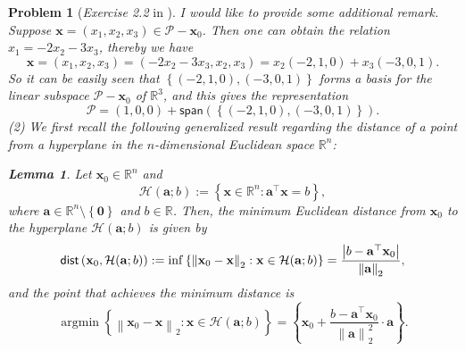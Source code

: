 \documentclass[11pt]{article}
\newtheorem{lemma}{Lemma}
\newtheorem{problem}{Problem}
\DeclareMathOperator*{\argmin}{argmin}
\begin{document}
\begin{problem} [\emph{Exercise 2.2} in \cite{calafiore2014optimization}]
{\indent I would like to provide some additional remark. Suppose $\mathbf{x} = \left( x_1, x_2, x_3 \right) \in \mathcal{P} - \mathbf{x}_0$. Then one can obtain the relation $x_1 = -2 x_2 - 3 x_3$, thereby we have
\begin{equation*}
    \mathbf{x} = \left( x_1, x_2, x_3 \right) = \left( -2 x_2 - 3 x_3, x_2, x_3 \right) = x_2 \left( -2, 1, 0 \right) + x_3 \left( -3, 0, 1 \right).
\end{equation*}
So it can be easily seen that $\left\{ \left( -2, 1, 0 \right), \left( -3, 0, 1 \right) \right\}$ forms a basis for the linear subspace $\mathcal{P} - \mathbf{x}_0$ of $\mathbb{R}^3$, and this gives the representation
\begin{equation*}
    \mathcal{P} = \left( 1, 0, 0 \right) + \textsf{span} \left( \left\{ \left( -2, 1, 0 \right), \left( -3, 0, 1 \right) \right\} \right).
\end{equation*}
\indent (2) We first recall the following generalized result regarding the distance of a point from a hyperplane in the $n$-dimensional Euclidean space $\mathbb{R}^n$:

\begin{lemma}
\label{lemma1}
Let $\mathbf{x}_0 \in \mathbb{R}^n$ and
\begin{equation*}
    \mathcal{H} (\mathbf{a}; b) := \left\{ \mathbf{x} \in \mathbb{R}^n : \mathbf{a}^{\top} \mathbf{x} = b \right\},
\end{equation*}
where $\mathbf{a} \in \mathbb{R}^n \setminus \left\{ \mathbf{0} \right\}$ and $b \in \mathbb{R}$. Then, the minimum Euclidean distance from $\mathbf{x}_0$ to the hyperplane $\mathcal{H} (\mathbf{a}; b)$ is given by
\begin{equation}
    \label{eqn1.1}
    \textnormal{\textsf{dist}} \left( \mathbf{x}_0, \mathcal{H} (\mathbf{a}; b) \right) := \inf \left\{ \left\| \mathbf{x}_0 - \mathbf{x} \right\|_2 : \mathbf{x} \in \mathcal{H} (\mathbf{a}; b) \right\} = \frac{\left| b - \mathbf{a}^{\top} \mathbf{x}_0 \right|}{\left\| \mathbf{a} \right\|_2},
\end{equation}
and the point that achieves the minimum distance is
\begin{equation}
    \label{eqn1.2}
    \argmin \left\{ \left\| \mathbf{x}_0 - \mathbf{x} \right\|_2 : \mathbf{x} \in \mathcal{H}(\mathbf{a}; b) \right\} = \left\{ \mathbf{x}_0 + \frac{b - \mathbf{a}^{\top} \mathbf{x}_0}{\left\| \mathbf{a} \right\|_{2}^2} \cdot \mathbf{a} \right\}.
\end{equation}
\end{lemma}

}
\end{problem}
\end{document}
